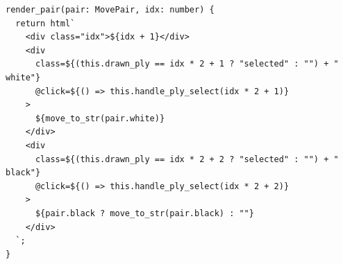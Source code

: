 \begin{itemize}
\begin{lstlisting}[language=RustHtml]
render_pair(pair: MovePair, idx: number) {
  return html`
    <div class="idx">${idx + 1}</div>
    <div
      class=${(this.drawn_ply == idx * 2 + 1 ? "selected" : "") + " white"}
      @click=${() => this.handle_ply_select(idx * 2 + 1)}
    >
      ${move_to_str(pair.white)}
    </div>
    <div
      class=${(this.drawn_ply == idx * 2 + 2 ? "selected" : "") + " black"}
      @click=${() => this.handle_ply_select(idx * 2 + 2)}
    >
      ${pair.black ? move_to_str(pair.black) : ""}
    </div>
  `;
}
\end{lstlisting}

\end{itemize}
